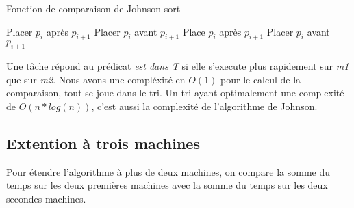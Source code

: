 \begin{algorithm}
\caption{Fonction de comparaison de Johnson-sort}
\begin{algorithmic}
		\STATE {}
		\STATE Placer $p_i$ après $p_{i+1}$
	\ELSE
		\STATE {}
		\STATE Placer $p_i$ avant $p_{i+1}$
	\ENDIF
\ELSE
		\STATE {}
		\STATE Place $p_i$ après $p_{i+1}$
	\ELSE
		\STATE {}
		\STATE Placer $p_i$ avant $p_{i+1}$ 
	\ENDIF
\ENDIF
\end{algorithmic}
\end{algorithm}

Une tâche répond au prédicat {\em est dans T} si elle s'execute plus rapidement
sur {\em m1} que sur {\em m2}.
Nous avons une compléxité en $O(1)$ pour le calcul de la comparaison, tout se joue
dans le tri. Un tri ayant optimalement une complexité de $O(n*log(n))$, c'est
aussi la complexité de l'algorithme de Johnson.

\subsection{Extention à trois machines}
Pour étendre l'algorithme à plus de deux machines, on compare la somme du temps
sur les deux premières machines avec la somme du temps sur les deux secondes
machines.
